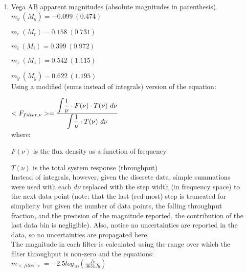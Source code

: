 \documentclass[11pt]{article}
\begin{document}
\begin{enumerate}
\begin{enumerate}
 
	 \item %
	 Vega AB apparent magnitudes (absolute magnitudes in parenthesis).\\
	 
	 \hspace{10mm}$m_{g}\ (M_{g}) = -0.099\ (0.474)$
	 
	 \hspace{10mm}$m_{r}\ (M_{r}) = 0.158\ (0.731)$
	 	  
	 \hspace{10mm}$m_{i}\ (M_{i}) =  0.399\ (0.972)$
	 
	 \hspace{10mm}$m_{z}\ (M_{z}) = 0.542\ (1.115)$
	 
	 \hspace{10mm}$m_{y}\ (M_{y}) = 0.622\ (1.195)$\\
	 	 
	 Using a modified (sums instead of integrals) version of the equation:
		 
		 	\hspace{10mm} $<F_{filter,\nu}> = \frac{\displaystyle \mathlarger{\int} \frac{1}{\nu} \cdot F(\nu) \cdot T(\nu)\ d\nu}{\displaystyle \mathlarger{\int} \frac{1}{\nu} \cdot T(\nu)\ d\nu}$ \\
		 	
		 	where:
		 	
		 	 \hspace {10mm}$F(\nu)$ is the flux density as a function of frequency 
		 	 
		 	 \hspace{10mm} $T(\nu)$ is the total system response (throughput)\\
		 	 
 	 
		Instead of integrals, however, given the discrete data, simple summations were used with each $d\nu$ replaced with the step width (in frequency space) to the next data point (note: that the last (red-most) step is truncated for simplicity but given the number of data points, the falling throughput fraction, and the precision of the magnitude reported, the contribution of the last data bin is negligible). Also, notice no uncertainties are reported in the data, so no uncertainties are propagated here.\\
		
		The magnitude in each filter is calculated using the range over which the filter throughput is non-zero and the equations:\\
			
			 \hspace{10mm} $m_{<filter>} = -2.5 log_{10}(\frac{\displaystyle f_{\nu}}{3631 Jy})$\\
			 

\end{enumerate}
\end{enumerate}
\end{document}
